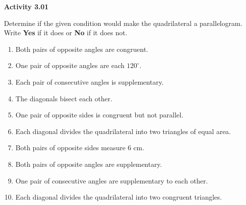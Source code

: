 \vspace{0.3ex}
\noindent\textbf{Activity 3.01}

\vspace{0.2ex}

Determine if the given condition would make the quadrilateral a parallelogram. Write \textbf{Yes} if it does or \textbf{No} if it does not.

\begin{enumerate}[label=\color{blue}\arabic*.]
    \item Both pairs of opposite angles are congruent.
    \item One pair of opposite angles are each \(120^\circ\).
    \item Each pair of consecutive angles is supplementary.
    \item The diagonals bisect each other.
    \item One pair of opposite sides is congruent but not parallel.
    \item Each diagonal divides the quadrilateral into two triangles of equal area.
    \item Both pairs of opposite sides measure 6 cm.
    \item Both pairs of opposite angles are supplementary.
    \item One pair of consecutive angles are supplementary to each other.
    \item Each diagonal divides the quadrilateral into two congruent triangles.
\end{enumerate}
